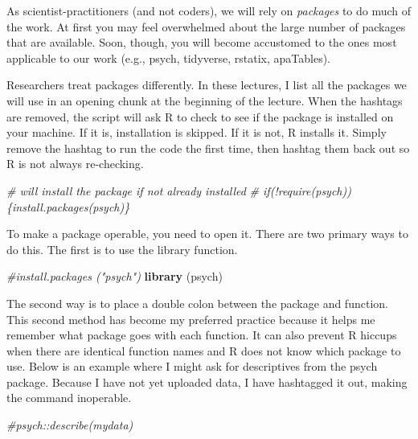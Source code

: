 \documentclass[
  11pt,
]{book}
\newenvironment{Shaded}{\begin{snugshade}}{\end{snugshade}}
\newcommand{\CommentTok}[1]{\textcolor[rgb]{0.37,0.37,0.37}{\textit{#1}}}
\newcommand{\FunctionTok}[1]{\textcolor[rgb]{0.27,0.27,0.27}{\textbf{#1}}}
\newcommand{\NormalTok}[1]{#1}
\begin{document}
As scientist-practitioners (and not coders), we will rely on \emph{packages} to do much of the work. At first you may feel overwhelmed about the large number of packages that are available. Soon, though, you will become accustomed to the ones most applicable to our work (e.g., psych, tidyverse, rstatix, apaTables).

Researchers treat packages differently. In these lectures, I list all the packages we will use in an opening chunk at the beginning of the lecture. When the hashtags are removed, the script will ask R to check to see if the package is installed on your machine. If it is, installation is skipped. If it is not, R installs it. Simply remove the hashtag to run the code the first time, then hashtag them back out so R is not always re-checking.

\begin{Shaded}
\begin{Highlighting}[]
\CommentTok{\# will install the package if not already installed}
\CommentTok{\# if(!require(psych))\{install.packages(\textquotesingle{}psych\textquotesingle{})\}}
\end{Highlighting}
\end{Shaded}

To make a package operable, you need to open it. There are two primary ways to do this. The first is to use the library function.

\begin{Shaded}
\begin{Highlighting}[]
\CommentTok{\#install.packages ("psych")}
\FunctionTok{library}\NormalTok{ (psych)}
\end{Highlighting}
\end{Shaded}

The second way is to place a double colon between the package and function. This second method has become my preferred practice because it helps me remember what package goes with each function. It can also prevent R hiccups when there are identical function names and R does not know which package to use. Below is an example where I might ask for descriptives from the psych package. Because I have not yet uploaded data, I have hashtagged it out, making the command inoperable.

\begin{Shaded}
\begin{Highlighting}[]
\CommentTok{\#psych::describe(mydata)}
\end{Highlighting}
\end{Shaded}
\end{document}
